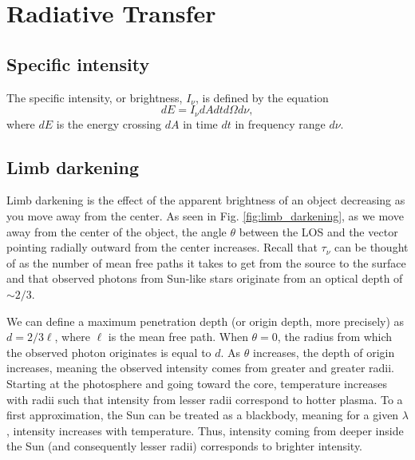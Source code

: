 \section{Radiative Transfer}

	\subsection{Specific intensity}
	The specific intensity, or brightness, $I_{\nu}$, is defined by the equation
	\begin{equation}
		\label{eq:spec_intensity}
		dE=I_{\nu}dAdtd\Omega d\nu,
	\end{equation}
	where $dE$ is the energy crossing $dA$ in time $dt$ in frequency range $d\nu$. 
	
	\subsection{Limb darkening}
	Limb darkening is the effect of the apparent brightness of an object decreasing as you move away from the center. As seen in Fig. \ref{fig:limb_darkening}, as we move away from the center of the object, the angle $\theta$ between the LOS and the vector pointing radially outward from the center increases. Recall that $\tau_{\nu}$ can be thought of as the number of mean free paths it takes to get from the source to the surface and that observed photons from Sun-like stars originate from an optical depth of $\sim2/3$. 
	
	We can define a maximum penetration depth (or origin depth, more precisely) as $d=2/3\ell$, where $\ell$ is the mean free path. When $\theta=0$, the radius from which the observed photon originates is equal to $d$. As $\theta$ increases, the depth of origin increases, meaning the observed intensity comes from greater and greater radii. Starting at the photosphere and going toward the core, temperature increases with radii such that intensity from lesser radii correspond to hotter plasma. To a first approximation, the Sun can be treated as a blackbody, meaning for a given $\lambda$, intensity increases with temperature. Thus, intensity coming from deeper inside the Sun (and consequently lesser radii) corresponds to brighter intensity. 
	
